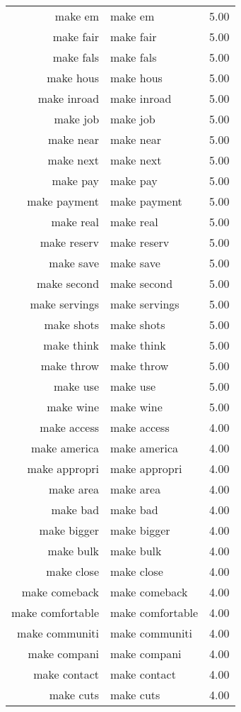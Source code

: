 \begin{table}[ht]
\begin{tabular}{rlr}
  make em & make em & 5.00 \\ 
  make fair & make fair & 5.00 \\ 
  make fals & make fals & 5.00 \\ 
  make hous & make hous & 5.00 \\ 
  make inroad & make inroad & 5.00 \\ 
  make job & make job & 5.00 \\ 
  make near & make near & 5.00 \\ 
  make next & make next & 5.00 \\ 
  make pay & make pay & 5.00 \\ 
  make payment & make payment & 5.00 \\ 
  make real & make real & 5.00 \\ 
  make reserv & make reserv & 5.00 \\ 
  make save & make save & 5.00 \\ 
  make second & make second & 5.00 \\ 
  make servings & make servings & 5.00 \\ 
  make shots & make shots & 5.00 \\ 
  make think & make think & 5.00 \\ 
  make throw & make throw & 5.00 \\ 
  make use & make use & 5.00 \\ 
  make wine & make wine & 5.00 \\ 
  make access & make access & 4.00 \\ 
  make america & make america & 4.00 \\ 
  make appropri & make appropri & 4.00 \\ 
  make area & make area & 4.00 \\ 
  make bad & make bad & 4.00 \\ 
  make bigger & make bigger & 4.00 \\ 
  make bulk & make bulk & 4.00 \\ 
  make close & make close & 4.00 \\ 
  make comeback & make comeback & 4.00 \\ 
  make comfortable & make comfortable & 4.00 \\ 
  make communiti & make communiti & 4.00 \\ 
  make compani & make compani & 4.00 \\ 
  make contact & make contact & 4.00 \\ 
  make cuts & make cuts & 4.00 \\ 

\end{tabular}
\end{table}
